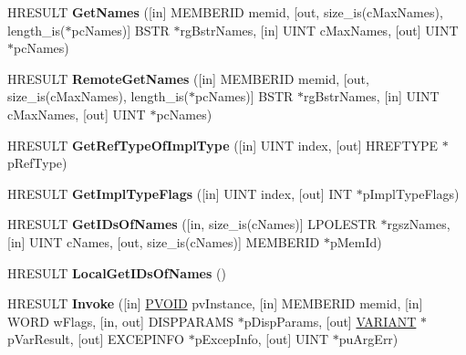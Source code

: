 \begin{DoxyCompactItemize}
\item 
\mbox{\label{interface_i_type_info_a371f92a3fce349757ec2521316d395d9}} 
H\+R\+E\+S\+U\+LT {\bfseries Get\+Names} (\mbox{[}in\mbox{]} M\+E\+M\+B\+E\+R\+ID memid, \mbox{[}out, size\+\_\+is(c\+Max\+Names), length\+\_\+is($\ast$pc\+Names)\mbox{]} B\+S\+TR $\ast$rg\+Bstr\+Names, \mbox{[}in\mbox{]} U\+I\+NT c\+Max\+Names, \mbox{[}out\mbox{]} U\+I\+NT $\ast$pc\+Names)
\item 
\mbox{\label{interface_i_type_info_a49744677239c140a641071f12c388e70}} 
H\+R\+E\+S\+U\+LT {\bfseries Remote\+Get\+Names} (\mbox{[}in\mbox{]} M\+E\+M\+B\+E\+R\+ID memid, \mbox{[}out, size\+\_\+is(c\+Max\+Names), length\+\_\+is($\ast$pc\+Names)\mbox{]} B\+S\+TR $\ast$rg\+Bstr\+Names, \mbox{[}in\mbox{]} U\+I\+NT c\+Max\+Names, \mbox{[}out\mbox{]} U\+I\+NT $\ast$pc\+Names)
\item 
\mbox{\label{interface_i_type_info_af81059b17ccc9923b90e054355f7976b}} 
H\+R\+E\+S\+U\+LT {\bfseries Get\+Ref\+Type\+Of\+Impl\+Type} (\mbox{[}in\mbox{]} U\+I\+NT index, \mbox{[}out\mbox{]} H\+R\+E\+F\+T\+Y\+PE $\ast$p\+Ref\+Type)
\item 
\mbox{\label{interface_i_type_info_af9f4e9d4df4c504a77336ef971315041}} 
H\+R\+E\+S\+U\+LT {\bfseries Get\+Impl\+Type\+Flags} (\mbox{[}in\mbox{]} U\+I\+NT index, \mbox{[}out\mbox{]} I\+NT $\ast$p\+Impl\+Type\+Flags)
\item 
\mbox{\label{interface_i_type_info_ad48f375b777c5e64dfe9cd127a5b37cc}} 
H\+R\+E\+S\+U\+LT {\bfseries Get\+I\+Ds\+Of\+Names} (\mbox{[}in, size\+\_\+is(c\+Names)\mbox{]} L\+P\+O\+L\+E\+S\+TR $\ast$rgsz\+Names, \mbox{[}in\mbox{]} U\+I\+NT c\+Names, \mbox{[}out, size\+\_\+is(c\+Names)\mbox{]} M\+E\+M\+B\+E\+R\+ID $\ast$p\+Mem\+Id)
\item 
\mbox{\label{interface_i_type_info_a6ebfd91cad44e8b799218cc23c43fbb7}} 
H\+R\+E\+S\+U\+LT {\bfseries Local\+Get\+I\+Ds\+Of\+Names} ()
\item 
\mbox{\label{interface_i_type_info_a1fadc14f8678c3dc22cb3fcc374fda65}} 
H\+R\+E\+S\+U\+LT {\bfseries Invoke} (\mbox{[}in\mbox{]} \hyperlink{interfacevoid}{P\+V\+O\+ID} pv\+Instance, \mbox{[}in\mbox{]} M\+E\+M\+B\+E\+R\+ID memid, \mbox{[}in\mbox{]} W\+O\+RD w\+Flags, \mbox{[}in, out\mbox{]} D\+I\+S\+P\+P\+A\+R\+A\+MS $\ast$p\+Disp\+Params, \mbox{[}out\mbox{]} \hyperlink{structtag_v_a_r_i_a_n_t}{V\+A\+R\+I\+A\+NT} $\ast$p\+Var\+Result, \mbox{[}out\mbox{]} E\+X\+C\+E\+P\+I\+N\+FO $\ast$p\+Excep\+Info, \mbox{[}out\mbox{]} U\+I\+NT $\ast$pu\+Arg\+Err)

\end{DoxyCompactItemize}
